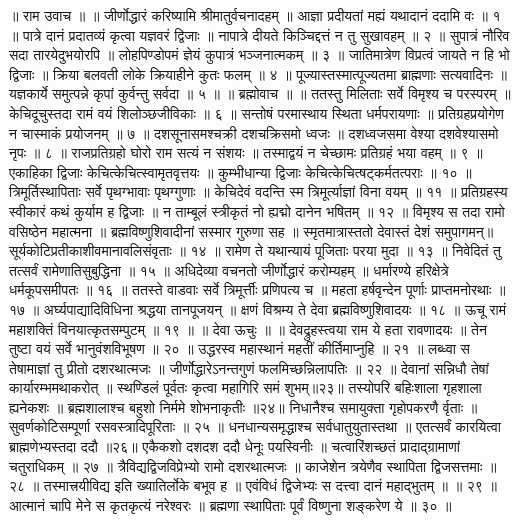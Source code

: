 ॥ राम उवाच ॥ ॥
जीर्णोद्धारं करिष्यामि श्रीमातुर्वचनादहम् ॥
आज्ञा प्रदीयतां मह्यं यथादानं ददामि वः ॥ १ ॥
पात्रे दानं प्रदातव्यं कृत्वा यज्ञवरं द्विजाः ॥
नापात्रे दीयते किञ्चिद्दत्तं न तु सुखावहम् ॥ २ ॥
सुपात्रं नौरिव सदा तारयेदुभयोरपि ॥
लोहपिण्डोपमं ज्ञेयं कुपात्रं भञ्जनात्मकम् ॥ ३ ॥
जातिमात्रेण विप्रत्वं जायते न हि भो द्विजाः ॥
क्रिया बलवती लोके क्रियाहीने कुतः फलम् ॥ ४ ॥
पूज्यास्तस्मात्पूज्यतमा ब्राह्मणाः सत्यवादिनः ॥
यज्ञकार्ये समुत्पन्ने कृपां कुर्वन्तु सर्वदा ॥ ५ ॥
॥ ब्रह्मोवाच ॥ ॥
ततस्तु मिलिताः सर्वे विमृश्य च परस्परम् ॥
केचिदूचुस्तदा रामं वयं शिलोञ्छजीविकाः ॥ ६ ॥
सन्तोषं परमास्थाय स्थिता धर्मपरायणाः ॥
प्रतिग्रहप्रयोगेण न चास्माकं प्रयोजनम् ॥ ७ ॥
दशसूनासमश्चक्री दशचक्रिसमो ध्वजः ॥
दशध्वजसमा वेश्या दशवेश्यासमो नृपः ॥ ८ ॥
राजप्रतिग्रहो घोरो राम सत्यं न संशयः ॥
तस्माद्वयं न चेच्छामः प्रतिग्रहं भया वहम् ॥ ९ ॥
एकाहिका द्विजाः केचित्केचित्स्वामृतवृत्तयः ॥
कुम्भीधान्या द्विजाः केचित्केचित्षट्कर्मतत्पराः ॥ १० ॥
त्रिमूर्तिस्थापिताः सर्वे पृथग्भावाः पृथग्गुणाः ॥
केचिदेवं वदन्ति स्म त्रिमूर्त्याज्ञां विना वयम् ॥ ११ ॥
प्रतिग्रहस्य स्वीकारं कथं कुर्याम ह द्विजाः ॥
न ताम्बूलं स्त्रीकृतं नो ह्यद्मो दानेन भषितम् ॥ १२ ॥
विमृश्य स तदा रामो वसिष्ठेन महात्मना ॥
ब्रह्मविष्णुशिवादीनां सस्मार गुरुणा सह ॥
स्मृतमात्रास्ततो देवास्तं देशं समुपागमन्॥
सूर्यकोटिप्रतीकाशीवमानावलिसंवृताः ॥ १४ ॥
रामेण ते यथान्यायं पूजिताः परया मुदा ॥ १३ ॥
निवेदितं तु तत्सर्वं रामेणातिसुबुद्धिना ॥ १५ ॥
अधिदेव्या वचनतो जीर्णोद्धारं करोम्यहम् ॥
धर्मारण्ये हरिक्षेत्रे धर्मकूपसमीपतः ॥ १६ ॥
ततस्ते वाडवाः सर्वे त्रिमूर्त्तीः प्रणिपत्य च ॥
महता हर्षवृन्देन पूर्णाः प्राप्तमनोरथाः ॥ १७ ॥
अर्घ्यपाद्यादिविधिना श्रद्धया तानपूजयन् ॥
क्षणं विश्रम्य ते देवा ब्रह्मविष्णुशिवादयः ॥ १८ ॥
ऊचू रामं महाशक्तिं विनयात्कृतसम्पुटम् ॥ १९ ॥
॥ देवा ऊचुः ॥ ॥
देवद्रुहस्त्वया राम ये हता रावणादयः ॥
तेन तुष्टा वयं सर्वे भानुवंशविभूषण ॥ २० ॥
उद्धरस्व महास्थानं महतीं कीर्तिमाप्नुहि ॥ २१ ॥
लब्ध्वा स तेषामाज्ञां तु प्रीतो दशरथात्मजः ॥
जीर्णोद्धारेऽनन्तगुणं फलमिच्छन्निलापतिः ॥ २२ ॥
देवानां सन्निधौ तेषां कार्यारम्भमथाकरोत् ॥
स्थण्डिलं पूर्वतः कृत्वा महागिरि समं शुभम्॥२३॥
तस्योपरि बहिःशाला गृहशाला ह्यनेकशः ॥
ब्रह्मशालाश्च बहुशो निर्ममे शोभनाकृतीः ॥२४॥
निधानैश्च समायुक्ता गृहोपकरणै र्वृताः ॥
सुवर्णकोटिसम्पूर्णा रसवस्त्रादिपूरिताः ॥ २५ ॥
धनधान्यसमृद्धाश्च सर्वधातुयुतास्तथा ॥
एतत्सर्वं कारयित्वा ब्राह्मणेभ्यस्तदा ददौ ॥२६॥
एकैकशो दशदश ददौ धेनूः पयस्विनीः ॥
चत्वारिंशच्छतं प्रादाद्ग्रामाणां चतुराधिकम् ॥ २७ ॥
त्रैविद्यद्विजविप्रेभ्यो रामो दशरथात्मजः ॥
काजेशेन त्रयेणैव स्थापिता द्विजसत्तमाः ॥ २८ ॥
तस्मात्त्रयीविद्य इति ख्यातिर्लोके बभूव ह ॥
एवंविधं द्विजेभ्यः स दत्त्वा दानं महाद्भुतम् ॥ ॥ २९ ॥
आत्मानं चापि मेने स कृतकृत्यं नरेश्वरः ॥
ब्रह्मणा स्थापिताः पूर्वं विष्णुना शङ्करेण ये ॥ ३० ॥
